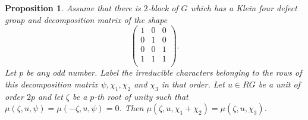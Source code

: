 \documentclass[11pt, a4paper]{amsart}
\newtheorem{proposition}[theorem]{Proposition}
\theoremstyle{definition}
\theoremstyle{definition}
\begin{document}
\begin{proposition}\label{prop:KleinFourDefect}
Assume that there is $2$-block of $G$ which has a Klein four defect group and decomposition matrix of the shape
\[\begin{pmatrix} 1 & 0 & 0 \\ 0 & 1 & 0 \\ 0 & 0 & 1 \\ 1 & 1 & 1 \\  \end{pmatrix}. \]
Let $p$ be any odd number. Label the irreducible characters belonging to the rows of this decomposition matrix $\psi,\chi_1,\chi_2$ and $\chi_3$ in that order. Let $u \in RG$ be a unit of order $2p$ and let $\zeta$ be a $p$-th root of unity such that $\mu(\zeta, u, \psi) = \mu(-\zeta, u, \psi) = 0$.  Then $\mu(\zeta, u, \chi_1+\chi_2) = \mu(\zeta, u, \chi_3)$.
\end{proposition}
\end{document}
